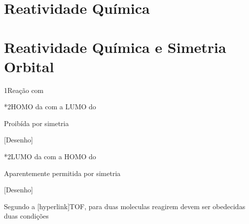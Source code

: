 
\setcounter{part}{21}
\part{Reatividade Química}

\part*{Reatividade Química e Simetria Orbital}

\begin{sectionBox}1{Reação  com }
    
    \begin{center}
    \end{center}


    \begin{sectionBox}*2{\textcolor{green\Light}{HOMO} da  com a \textcolor{red\Light}{LUMO} do }
        
        Proibída por simetria

        [Desenho]
        
    \end{sectionBox}

    \begin{sectionBox}*2{\textcolor{red\Light}{LUMO} da  com a \textcolor{green\Light}{HOMO} do }
        
        Aparentemente permitida por simetria

        [Desenho]
        
    \end{sectionBox}

    Segundo a [hyperlink]TOF, para duas moleculas reagirem devem ser obedecidas duas condições
    
\end{sectionBox}


